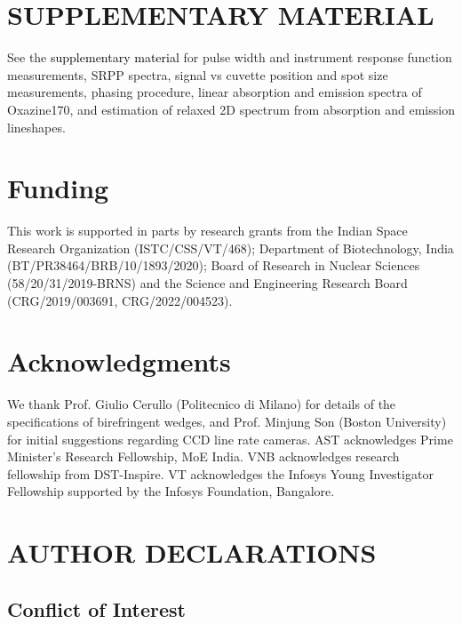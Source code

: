 \documentclass[%
aip,
amsmath,amssymb,
preprint,%
]{revtex4-2}
\newcommand*{\si}[1]{\textcolor{black}{ #1}}
\begin{document}
%

\section*{SUPPLEMENTARY MATERIAL}

See the \si{supplementary material} for pulse width and instrument response function measurements, SRPP spectra, signal vs cuvette position and spot size measurements, phasing procedure, linear absorption and emission spectra of Oxazine170, and estimation of relaxed 2D spectrum from absorption and emission lineshapes. %

\section*{Funding}

This work is supported in parts by research grants from the Indian Space Research Organization (ISTC/CSS/VT/468); Department of Biotechnology, India (BT/PR38464/BRB/10/1893/2020); Board of Research in Nuclear Sciences (58/20/31/2019-BRNS) and the Science and Engineering Research Board (CRG/2019/003691, CRG/2022/004523).


\section*{Acknowledgments}

We thank Prof. Giulio Cerullo (Politecnico di Milano) for details of the specifications of birefringent wedges, and Prof. Minjung Son (Boston University) for initial suggestions regarding CCD line rate cameras. AST acknowledges Prime Minister's Research Fellowship, MoE India. VNB acknowledges research fellowship from DST-Inspire. VT acknowledges the Infosys Young Investigator Fellowship supported by the Infosys Foundation, Bangalore. 


\section*{AUTHOR DECLARATIONS}
\subsection*{Conflict of Interest}
\end{document}

